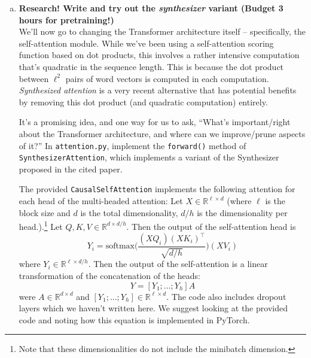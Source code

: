 \begin{enumerate}[(a)]


\pagebreak %

\item {} \textbf{Research! Write and try out the \textit{synthesizer} variant (Budget 3 hours for pretraining!)}\\
We'll now go to changing the Transformer architecture itself -- specifically, the self-attention module.
While we've been using a self-attention scoring function based on dot products, this involves a rather intensive computation that's quadratic in the sequence length. This is because the dot product between $\ell^2$ pairs of word vectors is computed in each computation.
\textit{Synthesized attention} \cite{tay2020synthesizer} is a very recent alternative that has potential benefits by removing this dot product (and quadratic computation) entirely.

It's a promising idea, and one way for us to ask, ``What's important/right about the Transformer architecture, and where can we improve/prune aspects of it?''
In \texttt{attention.py}, implement the \texttt{forward()} method of \texttt{SynthesizerAttention}, which implements a variant of the Synthesizer proposed in the cited paper.

The provided \texttt{CausalSelfAttention} implements the following attention for each head of the multi-headed attention:
Let $X\in \mathbb{R}^{\ell \times d}$ (where $\ell$ is the block size and $d$ is the total dimensionality, $d/h$ is the dimensionality per head.).\footnote{Note that these dimensionalities do not include the minibatch dimension.}
Let $Q,K,V \in \mathbb{R}^{d\times d/h}$.
Then the output of the self-attention head is 
\begin{equation} \label{qkv_eqn}
Y_i = \text{softmax}\bigg(\frac{(XQ_i)(XK_i)^\top}{\sqrt{d/h}}\bigg)(XV_i)
\end{equation}
where $Y_i\in\mathbb{R}^{\ell \times d/h}$.
Then the output of the self-attention is a linear transformation of the concatenation of the heads:
\begin{equation}
Y = [Y_1;\dots;Y_h]A
\end{equation}
were $A \in\mathbb{R}^{d\times d}$ and $[Y_1;\dots;Y_h]\in\mathbb{R}^{\ell \times d}$.
The code also includes dropout layers which we haven't written here.
We suggest looking at the provided code and noting how this equation is implemented in PyTorch.


\end{enumerate}
